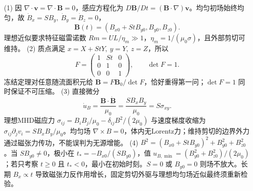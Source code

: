 (1) 因 \(\nabla\cdot\boldsymbol v=\nabla\cdot\boldsymbol B=0\)，感应方程化为 \(D\boldsymbol B/Dt=(\boldsymbol B\cdot\nabla)\boldsymbol v\)。均匀初场始终均匀，故 \(\dot B_x=SB_y,\ \dot B_y=\dot B_z=0\)，
\[
\boldsymbol B(t)=(B_{x0}+StB_{y0},B_{y0},B_{z0}).
\]
理想近似要求特征磁雷诺数 \(Rm=UL/\eta_m\gg1\)，\(\eta_m=1/(\mu_0\sigma)\)，且外部剪切可维持。
(2) 质点满足 \(x=X+StY,\ y=Y,\ z=Z\)，所以
\[
F=\begin{pmatrix}1&St&0\\0&1&0\\0&0&1\end{pmatrix},\qquad \det F=1.
\]
冻结定理对任意随流面积元给 \(\boldsymbol B=F\boldsymbol B_0/\det F\)，恰好重得第一问；\(\det F=1\) 同时保证不可压缩。
(3) 直接微分
\[
\dot u_B=\frac{\boldsymbol B\cdot\dot{\boldsymbol B}}{\mu_0}=\frac{S B_xB_y}{\mu_0}=S\sigma_{xy}.
\]
理想MHD磁应力 \(\sigma_{ij}=B_iB_j/\mu_0-\delta_{ij}B^2/(2\mu_0)\) 与速度梯度收缩为 \(\sigma_{ij}\partial_jv_i=S B_xB_y/\mu_0\)。均匀场 \(\nabla\times B=0\)，体内无Lorentz力；维持剪切的边界外力通过磁张力传功，不能误判为无源增能。
(4) \(B^2=(B_{x0}+StB_{y0})^2+B_{y0}^2+B_{z0}^2\)。当 \(S B_{y0}\ne0\)，极小在 \(t_*=-B_{x0}/(SB_{y0})\)，值 \(u_{B,\min}=(B_{y0}^2+B_{z0}^2)/(2\mu_0)\)；若只考察 \(t\ge0\) 且 \(t_*<0\)，最小在初始时刻。\(S=0\) 或 \(B_{y0}=0\) 则场不放大。长期 \(B_x\propto t\) 导致磁张力反作用增长，固定剪切外驱与理想均匀场近似最终须重新检验。
